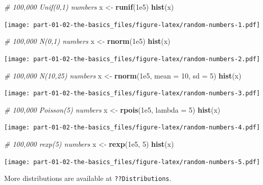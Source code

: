 \documentclass[
]{book}
\newenvironment{Shaded}{\begin{snugshade}}{\end{snugshade}}
\newcommand{\AttributeTok}[1]{\textcolor[rgb]{0.13,0.29,0.53}{#1}}
\newcommand{\CommentTok}[1]{\textcolor[rgb]{0.56,0.35,0.01}{\textit{#1}}}
\newcommand{\DecValTok}[1]{\textcolor[rgb]{0.00,0.00,0.81}{#1}}
\newcommand{\FloatTok}[1]{\textcolor[rgb]{0.00,0.00,0.81}{#1}}
\newcommand{\FunctionTok}[1]{\textcolor[rgb]{0.13,0.29,0.53}{\textbf{#1}}}
\newcommand{\NormalTok}[1]{#1}
\newcommand{\OtherTok}[1]{\textcolor[rgb]{0.56,0.35,0.01}{#1}}
\begin{document}
\begin{enumerate}
\begin{Shaded}
\begin{Highlighting}[]
\CommentTok{\# 100,000 Unif(0,1) numbers}
\NormalTok{x }\OtherTok{\textless{}{-}} \FunctionTok{runif}\NormalTok{(}\FloatTok{1e5}\NormalTok{)}
\FunctionTok{hist}\NormalTok{(x)}
\end{Highlighting}
\end{Shaded}

  \texttt{[image: part-01-02-the-basics\_files/figure-latex/random-numbers-1.pdf]}

\begin{Shaded}
\begin{Highlighting}[]
\CommentTok{\# 100,000 N(0,1) numbers}
\NormalTok{x }\OtherTok{\textless{}{-}} \FunctionTok{rnorm}\NormalTok{(}\FloatTok{1e5}\NormalTok{)}
\FunctionTok{hist}\NormalTok{(x)}
\end{Highlighting}
\end{Shaded}

  \texttt{[image: part-01-02-the-basics\_files/figure-latex/random-numbers-2.pdf]}

\begin{Shaded}
\begin{Highlighting}[]
\CommentTok{\# 100,000 N(10,25) numbers}
\NormalTok{x }\OtherTok{\textless{}{-}} \FunctionTok{rnorm}\NormalTok{(}\FloatTok{1e5}\NormalTok{, }\AttributeTok{mean =} \DecValTok{10}\NormalTok{, }\AttributeTok{sd =} \DecValTok{5}\NormalTok{)}
\FunctionTok{hist}\NormalTok{(x)}
\end{Highlighting}
\end{Shaded}

  \texttt{[image: part-01-02-the-basics\_files/figure-latex/random-numbers-3.pdf]}

\begin{Shaded}
\begin{Highlighting}[]
\CommentTok{\# 100,000 Poisson(5) numbers}
\NormalTok{x }\OtherTok{\textless{}{-}} \FunctionTok{rpois}\NormalTok{(}\FloatTok{1e5}\NormalTok{, }\AttributeTok{lambda =} \DecValTok{5}\NormalTok{)}
\FunctionTok{hist}\NormalTok{(x)}
\end{Highlighting}
\end{Shaded}

  \texttt{[image: part-01-02-the-basics\_files/figure-latex/random-numbers-4.pdf]}

\begin{Shaded}
\begin{Highlighting}[]
\CommentTok{\# 100,000 rexp(5) numbers}
\NormalTok{x }\OtherTok{\textless{}{-}} \FunctionTok{rexp}\NormalTok{(}\FloatTok{1e5}\NormalTok{, }\DecValTok{5}\NormalTok{)}
\FunctionTok{hist}\NormalTok{(x)}
\end{Highlighting}
\end{Shaded}

  \texttt{[image: part-01-02-the-basics\_files/figure-latex/random-numbers-5.pdf]}

  More distributions are available at \texttt{??Distributions}.
\end{enumerate}
\end{document}
